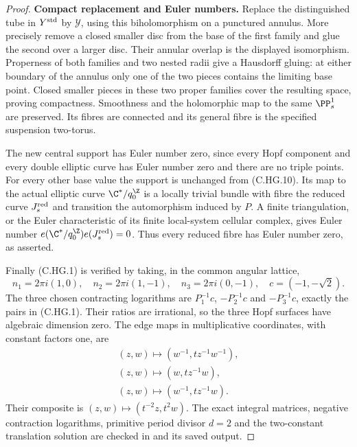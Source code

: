 \begin{proof}
\par\medskip\noindent\textbf{Compact replacement and Euler numbers.}
Replace the distinguished tube in
$Y^{\rm std}$ by $\mathcal Y$, using this
biholomorphism on a punctured annulus.
More precisely remove a closed smaller
disc from the base of the first family
and glue the second over a larger disc.
Their annular overlap is the displayed
isomorphism. Properness of both families
and two nested radii give a Hausdorff
gluing: at either boundary of the annulus
only one of the two pieces contains the
limiting base point. Closed smaller
pieces in these two proper families
cover the resulting space, proving
compactness. Smoothness and the
holomorphic map to the same $\PP^1_s$
are preserved. Its fibres are connected
and its general fibre is the specified
suspension two-torus.

The new central support has Euler number
zero, since every Hopf component and every
double elliptic curve has Euler number
zero and there are no triple points.
For every other base value the support
is unchanged from (C.HG.10). Its map to
the actual elliptic curve $\C^*/q_0^{\Z}$
is a locally trivial bundle with fibre
the reduced curve $J_s^{\rm red}$ and
transition the automorphism induced by
$P$. A finite triangulation, or the
Euler characteristic of its finite
local-system cellular complex, gives
Euler number
$e(\C^*/q_0^{\Z})e(J_s^{\rm red})=0$.
Thus every reduced fibre has Euler
number zero, as asserted.

Finally (C.HG.1) is verified by taking,
in the common angular lattice,
\[
 n_1=2\pi i(1,0),\quad
 n_2=2\pi i(1,-1),\quad
 n_3=2\pi i(0,-1),\quad
 c=(-1,-\sqrt2).
\tag{C.HG.15}
\]
The three chosen contracting logarithms
are $P_1^{-1}c$, $-P_2^{-1}c$ and
$-P_3^{-1}c$, exactly the pairs in
(C.HG.1). Their ratios are irrational,
so the three Hopf surfaces have
algebraic dimension zero. The edge
maps in multiplicative coordinates,
with constant factors one, are
\[
 \begin{gathered}
 (z,w)\mapsto(w^{-1},t z^{-1}w^{-1}),\\
 (z,w)\mapsto(w,t z^{-1}w),\\
 (z,w)\mapsto(w^{-1},t z^{-1}w).
 \end{gathered}
\tag{C.HG.16}
\]
Their composite is $(z,w)\mapsto(t^{-2}z,t^2w)$.
The exact integral matrices, negative
contraction logarithms, primitive
period divisor $d=2$ and the two-constant
translation solution are checked in
and its saved output.


\end{proof}
